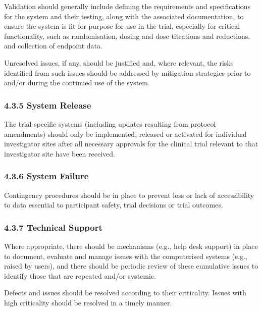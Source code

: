 \documentclass[11pt]{article}
\begin{document}
\begin{description}[leftmargin=2.5cm,style=sameline]
\item[(h)] Validation should generally include defining the requirements and specifications for the system and their testing, along with the associated documentation, to ensure the system is fit for purpose for use in the trial, especially for critical functionality, such as randomisation, dosing and dose titrations and reductions, and collection of endpoint data.

\item[(i)] Unresolved issues, if any, should be justified and, where relevant, the risks identified from such issues should be addressed by mitigation strategies prior to and/or during the continued use of the system.

\end{description}

\subsubsection{4.3.5 System Release}

The trial-specific systems (including updates resulting from protocol amendments) should only be implemented, released or activated for individual investigator sites after all necessary approvals for the clinical trial relevant to that investigator site have been received.


\subsubsection{4.3.6 System Failure}

Contingency procedures should be in place to prevent loss or lack of accessibility to data essential to participant safety, trial decisions or trial outcomes.


\subsubsection{4.3.7 Technical Support}

\begin{description}[leftmargin=2.5cm,style=sameline]

\item[(a)] Where appropriate, there should be mechanisms (e.g., help desk support) in place to document, evaluate and manage issues with the computerised systems (e.g., raised by users), and there should be periodic review of these cumulative issues to identify those that are repeated and/or systemic.

\item[(b)] Defects and issues should be resolved according to their criticality. Issues with high criticality should be resolved in a timely manner.

\end{description}
\end{document}
